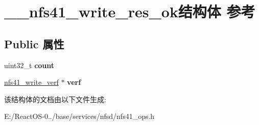 \hypertarget{struct____nfs41__write__res__ok}{}\section{\+\_\+\+\_\+nfs41\+\_\+write\+\_\+res\+\_\+ok结构体 参考}
\label{struct____nfs41__write__res__ok}
\subsection*{Public 属性}
\begin{DoxyCompactItemize}
\item 
\mbox{\label{struct____nfs41__write__res__ok_ae873c6096cdd9f96a08c6a446eaa7216}} 
uint32\+\_\+t {\bfseries count}
\item 
\mbox{\label{struct____nfs41__write__res__ok_a5fd53cf4411ee48f77e3224d66977853}} 
\hyperlink{struct____nfs41__write__verf}{nfs41\+\_\+write\+\_\+verf} $\ast$ {\bfseries verf}
\end{DoxyCompactItemize}


该结构体的文档由以下文件生成\+:\begin{DoxyCompactItemize}
\item 
E\+:/\+React\+O\+S-\/0../base/services/nfsd/nfs41\+\_\+ops.\+h\end{DoxyCompactItemize}
